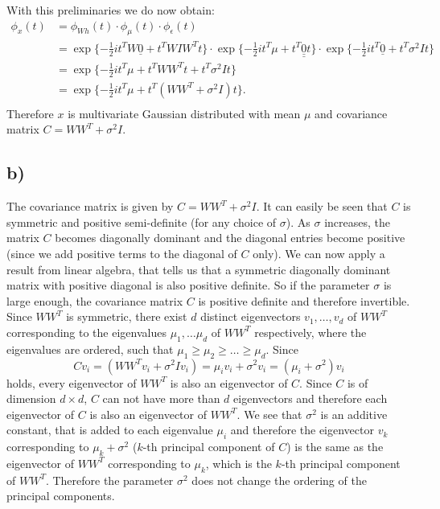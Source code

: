 \documentclass[paper=a4,fontsize=10pt,DIV11,BCOR10mm]{scrartcl}
\begin{document}
With this preliminaries we do now obtain:
\begin{align*}
\phi_x(t) &= \phi_{Wh}(t) \cdot \phi_\mu(t) \cdot \phi_\epsilon(t)\\
&= \exp\{{-\frac{1}{2}i t^T W\underline{0} + t^T W I W^T t}\} \cdot \exp\{{-\frac{1}{2}i t^T \mu + t^T \underline{\underline{0}} t}\} \cdot \exp \{{-\frac{1}{2}i t^T \underline{0} + t^T \sigma^2 I t}\}\\
&=\exp\{{-\frac{1}{2}i t^T \mu + t^T W W^T t + t^T \sigma^2 I t}\}\\
&=\exp\{{-\frac{1}{2}i t^T \mu + t^T( W W^T +\sigma^2 I)t}\}\text{.}\\
\end{align*}
Therefore $x$ is multivariate Gaussian distributed with mean $\mu$ and covariance matrix $C=W W^T +\sigma^2 I$.

\subsection*{b)}
The covariance matrix is given by $C=W W^T +\sigma^2 I$. It can easily be seen that $C$ is symmetric and positive semi-definite (for any choice of $\sigma$). As $\sigma$ increases, the matrix $C$ becomes diagonally dominant and the diagonal entries become positive (since we add positive terms to the diagonal of $C$ only). We can now apply a result from linear algebra, that tells us that a symmetric diagonally dominant matrix with positive diagonal is also positive definite. So if the parameter $\sigma$ is large enough, the covariance matrix $C$ is positive definite and therefore invertible.\\

Since $WW^T$ is symmetric, there exist $d$ distinct eigenvectors $v_1,\dots, v_d$ of $WW^T$ corresponding to the eigenvalues $\mu_1,\dots \mu_d$ of $WW^T$ respectively, where the eigenvalues are ordered, such that $\mu_1 \geq \mu_2 \geq \dots \geq \mu_d$. 
Since 
\begin{equation*}
Cv_i=(WW^Tv_i+\sigma^2 I v_i)= \mu_i v_i +\sigma^2 v_i = (\mu_i+\sigma^2)v_i
\end{equation*}
holds, every eigenvector of $WW^T$ is also an eigenvector of $C$. Since $C$ is of dimension $d \times d$, $C$ can not have more than $d$ eigenvectors and therefore each eigenvector of $C$ is also an eigenvector of $WW^T$. We see that $\sigma^2$ is an additive constant, that is added to each eigenvalue $\mu_i$ and therefore the eigenvector $v_k$ corresponding to $\mu_k+\sigma^2$ ($k$-th principal component of $C$) is the same as the eigenvector of $WW^T$ corresponding to $\mu_k$, which is the $k$-th principal component of $WW^T$. Therefore the parameter $\sigma^2$ does not change the ordering of the principal components.
\end{document}
